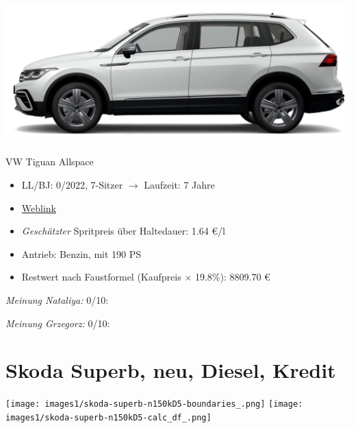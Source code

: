 \documentclass[landscape, DIV=99, 14pt]{scrartcl}
\begin{document}
\pagebreak
\begin{center}
\includegraphics[width=0.9\columnwidth]{cars/vw-tiguan-diesel.png}

VW Tiguan Allspace
\end{center}

\begin{itemize}
    \item LL/BJ: 0/2022, 7-Sitzer $\rightarrow$ Laufzeit: 7 Jahre
    \item \href{https://www.volkswagen.de/de/konfigurator.html/__app/der-neue-tiguan-allspace/der-tiguan-allspace---standardmodelle/elegance.app?buildabilityStatus-app=buildable&category-app=private&carlineId-app=31160&salesGroupId-app=32700&trimName-app=Elegance&modelId-app=BJ247T%24GYORYOR&modelVersion-app=2&modelYear-app=2022&exteriorId-app=F14+0Q0Q&interiorId-app=F56+++++BG&options-app=GWBAWBA-GPG4PG4-MAHV1M6-GPFCPFC-GRBDRBD-MKSUKA2}{Weblink}
    \item \emph{Gesch\"atzter} Spritpreis \"uber Haltedauer: 1.64 \euro{}/l
    \item Antrieb: Benzin, mit 190 PS
    \item Restwert nach Faustformel (Kaufpreis $\times$ 19.8\%): 8809.70 \euro{}
\end{itemize}

\begin{small}
\emph{Meinung Nataliya:} 0/10: 
        
\emph{Meinung Grzegorz:} 0/10: 
\end{small}

\pagebreak


\twocolumn

\section*{Skoda Superb, neu, Diesel, Kredit}
\begin{center}
\texttt{[image: images1/skoda-superb-n150kD5-boundaries\_.png]}
\null
\vspace{0.5cm}
\texttt{[image: images1/skoda-superb-n150kD5-calc\_df\_.png]}
\end{center}
\end{document}
